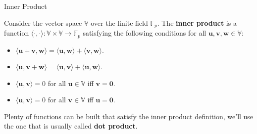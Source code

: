 \documentclass{zkdl-presentation-template}
\begin{document}
    \begin{frame}{Inner Product}
        \begin{definition}
            Consider the vector space $\mathbb{V}$ over the finite field $\mathbb{F}_p$. The 
            \textbf{inner product} is a function 
            $\langle \cdot, \cdot \rangle: \mathbb{V} \times \mathbb{V} \to \mathbb{F}_p$ satisfying 
            the following conditions for all $\boldsymbol{u},\boldsymbol{v},\boldsymbol{w} \in \mathbb{V}$:
            \begin{itemize}
                \item $\langle \boldsymbol{u} + \boldsymbol{v}, \boldsymbol{w} \rangle = \langle \boldsymbol{u}, \boldsymbol{w} \rangle + \langle \boldsymbol{v}, \boldsymbol{w} \rangle$.
                \item $\langle \boldsymbol{u}, \boldsymbol{v} + \boldsymbol{w} \rangle = \langle \boldsymbol{u}, \boldsymbol{v} \rangle + \langle \boldsymbol{u}, \boldsymbol{w} \rangle$.
                \item $\langle \boldsymbol{u}, \boldsymbol{v} \rangle = 0$ for all $\boldsymbol{u} \in \mathbb{V}$ iff $\boldsymbol{v} = \boldsymbol{0}$.
                \item $\langle \boldsymbol{u}, \boldsymbol{v} \rangle = 0$ for all $\boldsymbol{v} \in \mathbb{V}$ iff $\boldsymbol{u} = \boldsymbol{0}$.
            \end{itemize}
        \end{definition}   

        Plenty of functions can be built that satisfy the inner product definition, we'll use the one
        that is usually called \textbf{dot product}.
    \end{frame}
\end{document}
